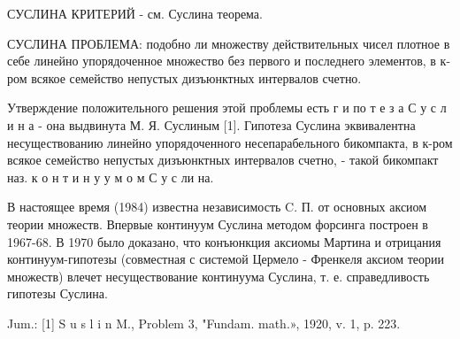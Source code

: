 \documentclass[10pt]{article}
\begin{document}
СУСЛИНА КРИТЕРИЙ - см. Суслина теорема.



СУСЛИНА ПРОБЛЕМА: подобно ли множеству действительных чисел плотное в себе линейно упорядоченное множество без первого и последнего элементов, в к-ром всякое семейство непустых дизъюнктных интервалов счетно.



Утверждение положительного решения этой проблемы есть г и по т е з а С у с л и н а - она выдвинута М. Я. Суслиным [1]. Гипотеза Суслина эквивалентна несуществованию линейно упорядоченного несепарабельного бикомпакта, в к-ром всякое семейство непустых дизъюнктных интервалов счетно, - такой бикомпакт наз. к о н т и н у у м о м С у с ли на.



В настоящее время (1984) известна независимость C. П. от основных аксиом теории множеств. Впервые континуум Суслина методом форсинга построен в 1967-68. В 1970 было доказано, что конъюнкция аксиомы Мартина и отрицания континуум-гипотезы (совместная с системой Цермело - Френкеля аксиом теории множеств) влечет несуществование континуума Суслина, т. е. справедливость гипотезы Суслина.



Jum.: [1] S u s l i n M., Problem 3, "Fundam. math.», 1920, v. 1, p. 223.
\end{document}
